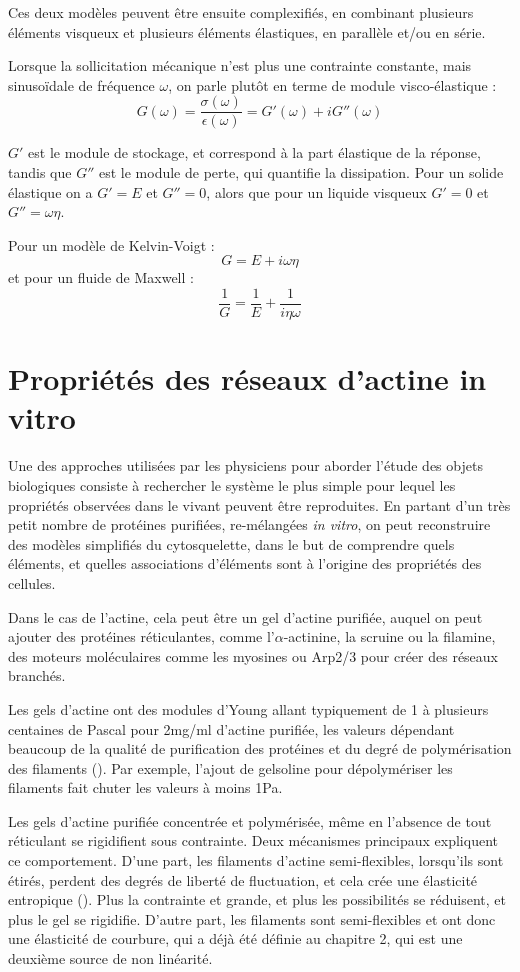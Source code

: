 Ces deux modèles peuvent être ensuite complexifiés, en combinant plusieurs éléments visqueux et plusieurs éléments élastiques, en parallèle et/ou en série. 

Lorsque la sollicitation mécanique n'est plus une contrainte constante, mais sinusoïdale de fréquence $\omega$, on parle plutôt en terme de module visco-élastique : 
$$G(\omega) = \frac{\sigma(\omega)}{\epsilon(\omega)} = G'(\omega)+iG''(\omega)$$

$G'$ est le module de stockage, et correspond à la part élastique de la réponse, tandis que $G''$ est le module de perte, qui quantifie la dissipation. Pour un solide élastique on a $G'=E$ et $G''=0$, alors que pour un liquide visqueux $G'=0$ et $G''=\omega \eta$. 

Pour un modèle de Kelvin-Voigt : 
$$ G=E+ i \omega \eta$$
et pour un fluide de Maxwell : 
$$ \frac{1}{G} = \frac{1}{E} + \frac{1}{i \eta \omega}$$


\section{Propriétés des réseaux d'actine in vitro}

Une des approches utilisées par les physiciens pour aborder l'étude des objets biologiques consiste à rechercher le système le plus simple pour lequel les propriétés observées dans le vivant peuvent être reproduites. 
En partant d'un très petit nombre de protéines purifiées, re-mélangées \textit{in vitro}, on peut reconstruire des modèles simplifiés du cytosquelette, dans le but de comprendre quels éléments, et quelles associations d'éléments sont à l'origine des propriétés des cellules. 

Dans le cas de l'actine, cela peut être un gel d'actine purifiée, auquel on peut ajouter des protéines réticulantes, comme l'$\alpha$-actinine, la scruine ou la filamine, des moteurs moléculaires comme les myosines ou Arp2/3 pour créer des réseaux branchés. 

Les gels d'actine ont des modules d'Young allant typiquement de 1 à plusieurs centaines de Pascal pour 2mg/ml d'actine purifiée, les valeurs dépendant beaucoup de la qualité de purification des protéines et du degré de polymérisation des filaments (\cite{janmey_mechanical_1994}). Par exemple, l'ajout de gelsoline pour dépolymériser les filaments fait chuter les valeurs à moins 1Pa. 

Les gels d'actine purifiée concentrée et polymérisée, même en l'absence de tout réticulant se rigidifient sous contrainte. Deux mécanismes principaux expliquent ce comportement. 
D'une part, les filaments d'actine semi-flexibles, lorsqu'ils sont étirés, perdent des degrés de liberté de fluctuation, et cela crée une élasticité entropique (\cite{storm_nonlinear_2005}). Plus la contrainte et grande, et plus les possibilités se réduisent, et plus le gel se rigidifie. 
D'autre part, les filaments sont semi-flexibles et ont donc une élasticité de courbure, qui a déjà été définie au chapitre 2, qui est une deuxième source de non linéarité. 

